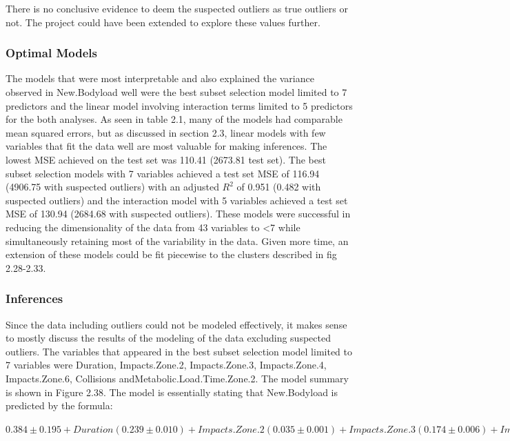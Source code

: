 There is no conclusive evidence to deem the suspected outliers as true outliers or not. The project could have been extended to explore these values further.

\subsubsection{Optimal Models}
The models that were most interpretable and also explained the variance observed in New.Bodyload well were the best subset selection model limited to 7 predictors and the linear model involving interaction terms limited to 5 predictors for the both analyses. As seen in table 2.1, many of the models had comparable mean squared errors, but as discussed in section 2.3, linear models with few variables that fit the data well are most valuable for making inferences. The lowest MSE achieved on the test set was 110.41 (2673.81 test set). The best subset selection models with 7 variables achieved a test set MSE of 116.94 (4906.75 with suspected outliers) with an adjusted $R^2$ of 0.951 (0.482 with suspected outliers) and the interaction model with 5 variables achieved a test set MSE of 130.94 (2684.68 with suspected outliers). These models were successful in reducing the dimensionality of the data from 43 variables to \textless7 while simultaneously retaining most of the variability in the data. Given more time, an extension of these models could be fit piecewise to the clusters described in fig 2.28-2.33.

\subsubsection{Inferences}
Since the data including outliers could not be modeled effectively, it makes sense to mostly discuss the results of the modeling of the data excluding suspected outliers. The variables that appeared in the best subset selection model limited to 7 variables were Duration, Impacts.Zone.2, Impacts.Zone.3, Impacts.Zone.4, Impacts.Zone.6, Collisions and\break Metabolic.Load.Time.Zone.2. The model summary is shown in Figure 2.38. The model is essentially stating that New.Bodyload is predicted by the formula:

\hfill
\newline
$
0.384\pm{0.195}+Duration(0.239\pm{0.010})+Impacts.Zone.2(0.035\pm{0.001})+Impacts.Zone.3(0.174\pm{0.006})+Impacts.Zone.4(0.258\pm{0.021})+Impacts.Zone.6(1.719\pm{0.063})+Collisions(0.640\pm{0.028})+Metabolic.Load.Time.Zone.2(3.021\pm{0.094})
$
\hfill
\newline

